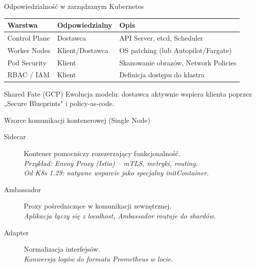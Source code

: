 \documentclass[aspectratio=169]{beamer}
\begin{document}
\begin{frame}{Odpowiedzialność w zarządzanym Kubernetes}
    \begin{table}
        \footnotesize
        \begin{tabular}{lll}
            \toprule
            \textbf{Warstwa} & \textbf{Odpowiedzialny} & \textbf{Opis} \\
            \midrule
            Control Plane & Dostawca & API Server, etcd, Scheduler \\
            Worker Nodes & Klient/Dostawca & OS patching (lub Autopilot/Fargate) \\
            Pod Security & Klient & Skanowanie obrazów, Network Policies \\
            RBAC / IAM & Klient & Definicja dostępu do klastra \\
            \bottomrule
        \end{tabular}
    \end{table}
    \begin{block}{Shared Fate (GCP)}
        Ewolucja modelu: dostawca aktywnie wspiera klienta poprzez „Secure Blueprints" i policy-as-code.
    \end{block}
\end{frame}

\begin{frame}{Wzorce komunikacji kontenerowej (Single Node)}
    \begin{description}
        \item[Sidecar] Kontener pomocniczy rozszerzający funkcjonalność. \\
            \textit{Przykład: Envoy Proxy (Istio) – mTLS, metryki, routing.} \\
            \textit{Od K8s 1.29: natywne wsparcie jako specjalny initContainer.}
        \item[Ambassador] Proxy pośredniczące w komunikacji zewnętrznej. \\
            \textit{Aplikacja łączy się z localhost, Ambassador routuje do shardów.}
        \item[Adapter] Normalizacja interfejsów. \\
            \textit{Konwersja logów do formatu Prometheus w locie.}
    \end{description}
\end{frame}
\end{document}
